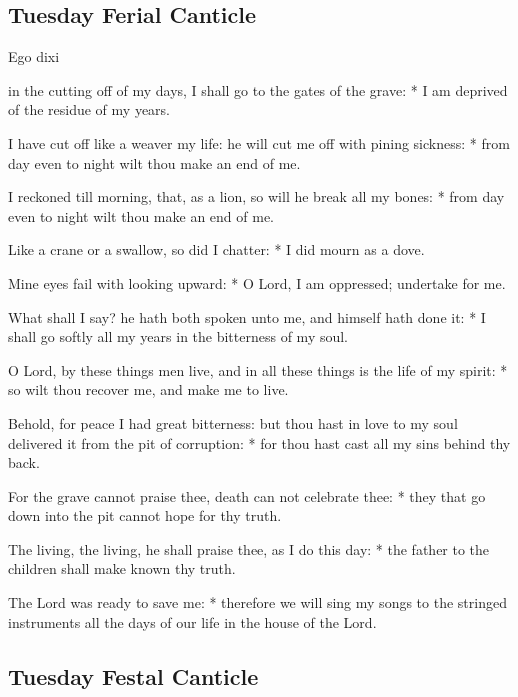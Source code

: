 \begin{multicols}{2}
\subsection{Tuesday Ferial Canticle}

\begin{inhead}
Ego dixi
\end{inhead}

 in the cutting off of my days, {\dag} I shall go to the gates of the grave: * I am deprived of the residue of my years.\par
{}
I have cut off like a weaver my life: {\dag} he will cut me off with pining sickness: * from day even to night wilt thou make an end of me.\par
I reckoned till morning, {\dag} that, as a lion, so will he break all my bones: * from day even to night wilt thou make an end of me.\par
Like a crane or a swallow, so did I chatter: * I did mourn as a dove.\par
Mine eyes fail with looking upward: * O Lord, I am oppressed; undertake for me.\par
What shall I say? {\dag} he hath both spoken unto me, and himself hath done it: * I shall go softly all my years in the bitterness of my soul.\par
O Lord, by these things men live, {\dag} and in all these things is the life of my spirit: * so wilt thou recover me, and make me to live.\par
Behold, for peace I had great bitterness: {\dag} but thou hast in love to my soul delivered it from the pit of corruption: * for thou hast cast all my sins behind thy back.\par
For the grave cannot praise thee, {\dag} death can not celebrate thee: * they that go down into the pit cannot hope for thy truth.\par
The living, the living, he shall praise thee, as I do this day: * the father to the children shall make known thy truth.\par
The Lord was ready to save me: * therefore we will sing my songs to the stringed instruments all the days of our life in the house of the Lord.

\subsection{Tuesday Festal Canticle}


\end{multicols}
